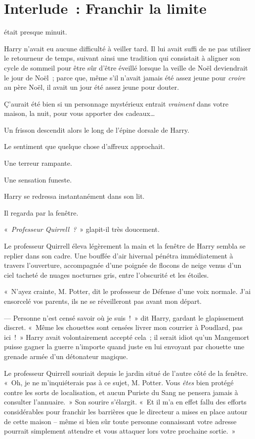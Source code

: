 \chapter{Interlude~: Franchir la limite}

 était presque minuit.

\hplettrineextrapara
Harry n'avait eu aucune difficulté à veiller tard.
Il lui avait suffi de ne pas utiliser le retourneur de temps, suivant ainsi une tradition qui consistait à aligner son cycle de sommeil pour être sûr d'être éveillé lorsque la veille de Noël deviendrait le jour de Noël~; parce que, même s'il n'avait jamais été assez jeune pour \emph{croire} au père Noël, il avait un jour été assez jeune pour douter.

Ç'aurait été bien si un personnage mystérieux entrait \emph{vraiment} dans votre maison, la nuit, pour vous apporter des cadeaux…

Un frisson descendit alors le long de l'épine dorsale de Harry.

Le sentiment que quelque chose d'affreux approchait.

Une terreur rampante.

Une sensation funeste.

Harry se redressa instantanément dans son lit.

Il regarda par la fenêtre.

«~\emph{Professeur Quirrell~?}~» glapit-il très doucement.

Le professeur Quirrell éleva légèrement la main et la fenêtre de Harry sembla se replier dans son cadre.
Une bouffée d'air hivernal pénétra immédiatement à travers l'ouverture, accompagnée d'une poignée de flocons de neige venus d'un ciel tacheté de nuages nocturnes gris, entre l'obscurité et les étoiles.

«~N'ayez crainte, M. Potter, dit le professeur de Défense d'une voix normale.
J'ai ensorcelé vos parents, ils ne se réveilleront pas avant mon départ.

--- Personne n'est censé savoir où je suis~!~»
dit Harry, gardant le glapissement discret.
«~Même les chouettes sont censées livrer mon courrier à Poudlard, pas ici~!~»
Harry avait volontairement accepté cela~; il serait idiot qu'un Mangemort puisse gagner la guerre n'importe quand juste en lui envoyant par chouette une grenade armée d'un détonateur magique.

Le professeur Quirrell souriait depuis le jardin situé de l'autre côté de la fenêtre.
«~Oh, je ne m'inquiéterais pas à ce sujet, M. Potter.
Vous \emph{êtes} bien protégé contre les sorts de localisation, et aucun Puriste du Sang ne pensera jamais à consulter l'annuaire.~»
Son sourire s'élargit.
«~Et il m'a en effet fallu des efforts considérables pour franchir les barrières que le directeur a mises en place autour de cette maison -- même si bien sûr toute personne connaissant votre adresse pourrait simplement attendre et vous attaquer lors votre prochaine sortie.~»

